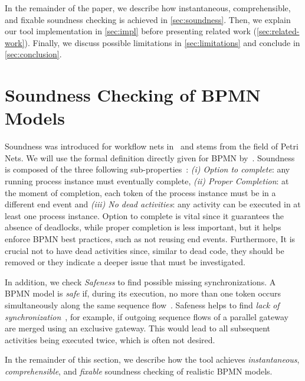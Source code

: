 \documentclass[runningheads]{llncs}
\begin{document}
In the remainder of the paper, we describe how instantaneous, comprehensible, and fixable soundness checking is achieved in \autoref{sec:soundness}.
Then, we explain our tool implementation in \autoref{sec:impl} before presenting related work (\autoref{sec:related-work}).
Finally, we discuss possible limitations in \autoref{sec:limitations} and conclude in \autoref{sec:conclusion}.

\section{Soundness Checking of BPMN Models} \label{sec:soundness}

Soundness was introduced for workflow nets in~\cite{vanderaalstApplicationPetriNets1998} and stems from the field of Petri Nets.
We will use the formal definition directly given for BPMN by~\cite{corradiniClassificationBPMNCollaborations2018}.
Soundness is composed of the three following sub-properties~\cite{corradiniClassificationBPMNCollaborations2018}:
\textit{(i) Option to complete}: any running process instance must eventually complete,
\textit{(ii) Proper Completion}: at the moment of completion, each token of the process instance must be in a different end event and
\textit{(iii) No dead activities}: any activity can be executed in at least one process instance.
Option to complete is vital since it guarantees the absence of deadlocks, while proper completion is less important, but it helps enforce BPMN best practices, such as not reusing end events.
Furthermore, It is crucial not to have dead activities since, similar to dead code, they should be removed or they indicate a deeper issue that must be investigated.

In addition, we check \textit{Safeness} to find possible missing synchronizations.
A BPMN model is \textit{safe} if, during its execution, no more than one token occurs simultaneously along the same sequence flow~\cite{corradiniClassificationBPMNCollaborations2018}.
Safeness helps to find \textit{lack of synchronization}~\cite{fahlandAnalysisDemandInstantaneous2011}, for example, if outgoing sequence flows of a parallel gateway are merged using an exclusive gateway.
This would lead to all subsequent activities being executed twice, which is often not desired.

In the remainder of this section, we describe how the tool achieves \textit{instantaneous}, \textit{comprehensible}, and \textit{fixable} soundness checking of realistic BPMN models.
\end{document}
